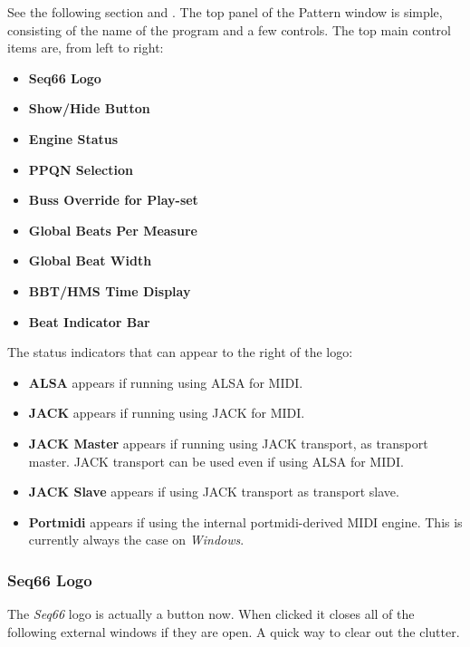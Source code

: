    See the following section and
   .
   The top panel of the Pattern window is simple, consisting of the
   name of the program and a few controls.
   The top main control items are, from left to right:

   \begin{itemize}
      \item \textbf{Seq66 Logo}
      \item \textbf{Show/Hide Button}
      \item \textbf{Engine Status}
      \item \textbf{PPQN Selection}
      \item \textbf{Buss Override for Play-set}
      \item \textbf{Global Beats Per Measure}
      \item \textbf{Global Beat Width}
      \item \textbf{BBT/HMS Time Display}
      \item \textbf{Beat Indicator Bar}
   \end{itemize}

   The status indicators that can appear to the right of the logo:

   \begin{itemize}
      \item \textbf{ALSA} appears if running using ALSA for MIDI.
      \item \textbf{JACK} appears if running using JACK for MIDI.
      \item \textbf{JACK Master} appears if running using JACK transport, as
         transport master.
         JACK transport can be used even if using ALSA for MIDI.
      \item \textbf{JACK Slave} appears if using JACK transport as
         transport slave.
      \item \textbf{Portmidi} appears if using the internal portmidi-derived
         MIDI engine.  This is currently always the case on \textsl{Windows}.
   \end{itemize}

\subsubsection{Seq66 Logo}
\label{subsubsec:introduction_seq66_logo}

   The \textsl{Seq66} logo is actually a button now.
   When clicked it closes all of the following external windows if they are
   open. A quick way to clear out the clutter.


